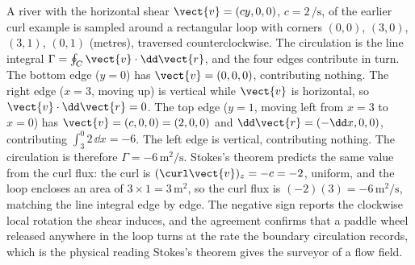 \begin{example}
A river with the horizontal shear $\vect{v} = (cy, 0, 0)$, $c =
2\,\si{\per\second}$, of the earlier curl example is sampled around a
rectangular loop with corners $(0, 0)$, $(3, 0)$, $(3, 1)$, $(0, 1)$
(metres), traversed counterclockwise. The circulation is the line
integral $\Gamma = \oint_{C}\vect{v}\cdot\dd\vect{r}$, and the four
edges contribute in turn. The bottom edge ($y = 0$) has $\vect{v} =
(0, 0, 0)$, contributing nothing. The right edge ($x = 3$, moving up)
is vertical while $\vect{v}$ is horizontal, so $\vect{v}\cdot\dd
\vect{r} = 0$. The top edge ($y = 1$, moving left from $x = 3$ to
$x = 0$) has $\vect{v} = (c, 0, 0) = (2, 0, 0)$ and $\dd\vect{r} =
(-\dd x, 0, 0)$, contributing $\int_{3}^{0}2\,\dd x = -6$. The left
edge is vertical, contributing nothing. The circulation is therefore
$\Gamma = -6\,\si{\meter\squared\per\second}$. Stokes's theorem
predicts the same value from the curl flux: the curl is
$(\curl\vect{v})_{z} = -c = -2$, uniform, and the loop encloses an area
of $3\times 1 = 3\,\si{\meter\squared}$, so the curl flux is
$(-2)(3) = -6\,\si{\meter\squared\per\second}$, matching the line
integral edge by edge. The negative sign reports the clockwise local
rotation the shear induces, and the agreement confirms that a paddle
wheel released anywhere in the loop turns at the rate the boundary
circulation records, which is the physical reading Stokes's theorem
gives the surveyor of a flow field.
\end{example}

